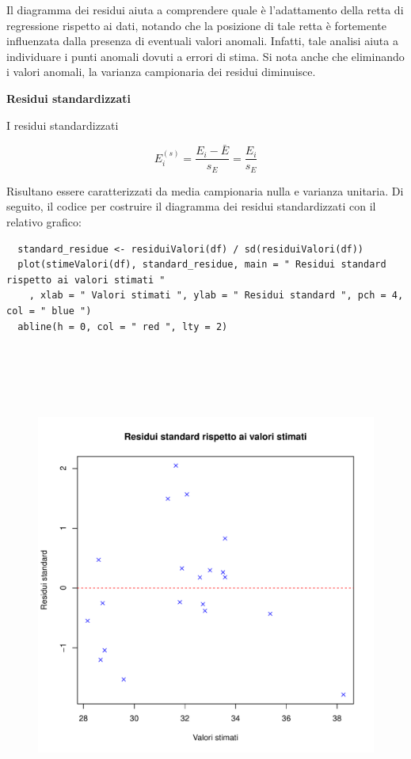 Il diagramma dei residui aiuta a comprendere quale è l'adattamento della retta di regressione rispetto ai dati, notando che la posizione di tale retta è fortemente influenzata dalla presenza di eventuali valori anomali. Infatti, tale analisi aiuta a individuare i punti anomali dovuti a errori di stima. Si nota anche che eliminando i valori anomali, la varianza campionaria dei residui diminuisce.

\vspace{5mm}
\noindent \textbf{Residui standardizzati}
\vspace{5mm}

I residui standardizzati

\[E_i^{(s)} = \frac{E_i - \bar{E}}{s_E} = \frac{E_i}{s_E}\]

Risultano essere caratterizzati da media campionaria nulla e varianza unitaria. Di seguito, il codice per costruire il diagramma dei residui standardizzati con il relativo grafico:

\vspace{5mm}
\begin{lstlisting}
  standard_residue <- residuiValori(df) / sd(residuiValori(df))
  plot(stimeValori(df), standard_residue, main = " Residui standard rispetto ai valori stimati "
    , xlab = " Valori stimati ", ylab = " Residui standard ", pch = 4, col = " blue ")
  abline(h = 0, col = " red ", lty = 2)
\end{lstlisting}
\vspace{5mm}

\vspace{5mm}
\begin{figure}[!htbp]
    \centering
    \includegraphics[height=16cm]{ProgettoSAD/capitoli/images/s_desc_biv/residui_standardizzati.pdf}
\end{figure}

